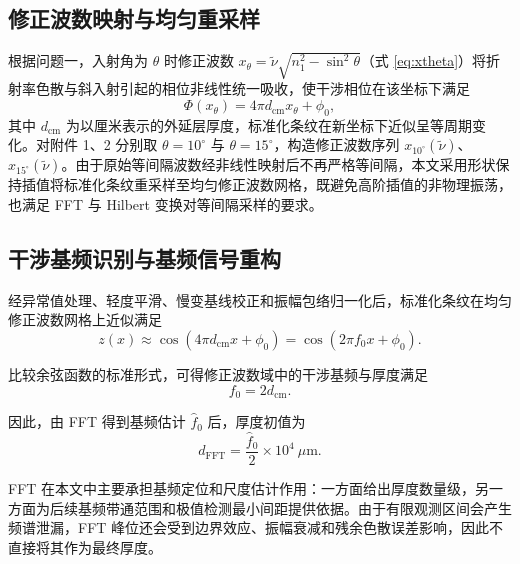 \documentclass[withoutpreface,bwprint]{cumcmthesis}
\begin{document}
\subsection{修正波数映射与均匀重采样}
\label{subsec:q2_corrected_wavenumber}

根据问题一，入射角为 $\theta$ 时修正波数 $x_\theta=\tilde\nu\sqrt{n_1^2-\sin^2\theta}$（式 \eqref{eq:xtheta}）将折射率色散与斜入射引起的相位非线性统一吸收，使干涉相位在该坐标下满足
\begin{equation}
	\Phi(x_\theta)
	=
	4\pi d_{\mathrm{cm}}x_\theta+\phi_0,
	\label{eq:q2_linear_phase}
\end{equation}
其中 $d_{\mathrm{cm}}$ 为以厘米表示的外延层厚度，标准化条纹在新坐标下近似呈等周期变化。对附件 1、2 分别取 $\theta=10^\circ$ 与 $\theta=15^\circ$，构造修正波数序列 $x_{10^\circ}(\widetilde{\nu})$、$x_{15^\circ}(\widetilde{\nu})$。由于原始等间隔波数经非线性映射后不再严格等间隔，本文采用形状保持插值将标准化条纹重采样至均匀修正波数网格，既避免高阶插值的非物理振荡，也满足 FFT 与 Hilbert 变换对等间隔采样的要求。

\subsection{干涉基频识别与基频信号重构}
\label{subsec:q2_fft}

经异常值处理、轻度平滑、慢变基线校正和振幅包络归一化后，标准化条纹在均匀修正波数网格上近似满足
\begin{equation}
	z(x)
	\approx
	\cos\left(4\pi d_{\mathrm{cm}}x+\phi_0\right)
	=
	\cos\left(2\pi f_0x+\phi_0\right).
	\label{eq:q2_standardized_fringe}
\end{equation}

比较余弦函数的标准形式，可得修正波数域中的干涉基频与厚度满足
\begin{equation}
	f_0=2d_{\mathrm{cm}}.
	\label{eq:q2_frequency_thickness}
\end{equation}

因此，由 FFT 得到基频估计 $\widehat f_0$ 后，厚度初值为
\begin{equation}
	d_{\mathrm{FFT}}
	=
	\frac{\widehat f_0}{2}\times10^4
	\ \mu\mathrm{m}.
	\label{eq:q2_fft_thickness}
\end{equation}

FFT 在本文中主要承担基频定位和尺度估计作用：一方面给出厚度数量级，另一方面为后续基频带通范围和极值检测最小间距提供依据。由于有限观测区间会产生频谱泄漏，FFT 峰位还会受到边界效应、振幅衰减和残余色散误差影响，因此不直接将其作为最终厚度。
\end{document}
